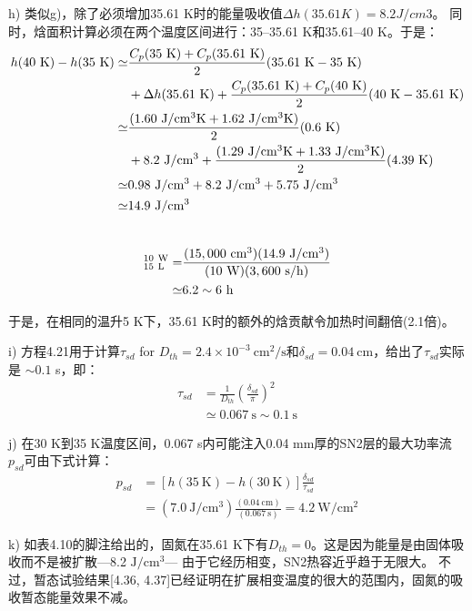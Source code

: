 h) 类似g)，除了必须增加35.61 K时的能量吸收值$\Delta h(35.61 K)=8.2 J/cm3$。
同时，焓面积计算必须在两个温度区间进行：35–35.61 K和35.61–40 K。于是：
\begin{align*}%
h(40\ \mathrm{K})-h(35\ \mathrm{K})\simeq&\frac{C_p(35\ \mathrm{K})+C_p(35.61\ \mathrm{K})}{2}(35.61\ \mathrm{K}-35\ \mathrm{K}) \\\notag
&+\Delta h(35.61\ \mathrm{K})+\frac{C_p(35.61\ \mathrm{K})+C_p(40\ \mathrm{K})}{2}(40\ \mathrm{K}-35.61\ \mathrm{K})\\\notag
\simeq&\frac{(1.60\ \mathrm{J/cm^3 K}+1.62\ \mathrm{J/cm^3 K})}{2}(0.6\ \mathrm{K})\\\notag
&+8.2\ \mathrm{J/cm^3}+\frac{(1.29\ \mathrm{J/cm^3 K}+1.33\ \mathrm{J/cm^3 K})}{2}(4.39\ \mathrm{K})\\\notag
\simeq&0.98\ \mathrm{J/cm^3}+8.2\ \mathrm{J/cm^3}+5.75\ \mathrm{J/cm^3}\\\notag
\simeq& 14.9\ \mathrm{J/cm^3}\\\notag
\end{align*}

\begin{align*}
[\Delta t(30\ \mathrm{K} \rightarrow 35\ \mathrm{K})]_{15\ \mathrm{L}}^{10\ \mathrm{W}}=&\frac{(15,000\ \mathrm{cm^3})(14.9\ \mathrm{J/cm^3})}{(10\ \mathrm{W})(3,600\ \mathrm{s/h})}\\\notag
\simeq&6.2\sim 6\ \mathrm{h} \notag
\end{align*}

于是，在相同的温升5 K下，35.61 K时的额外的焓贡献令加热时间翻倍(2.1倍)。

i) 方程4.21用于计算$\tau_{sd}$ for $D_{th} = 2.4\times 10^{−3} \ \mathrm{cm^2/s}$和$\delta_{sd}=0.04\ \mathrm{cm}$，给出了$\tau_{sd}$实际是 $\sim 0.1$ s，即：
\begin{align*}%
\tau_{sd}&=\frac{1}{D_{th}}\left(\frac{\delta_{sd}}{\pi}\right)^2 \\\tag{4.21}
&\simeq 0.067\ \mathrm{s}\sim 0.1\ \mathrm{s}
\end{align*}

j) 在30 K到35 K温度区间，0.067 s内可能注入0.04 mm厚的SN2层的最大功率流$p_{sd}$可由下式计算：
\begin{align*}%
p_{sd}&=[h(35\ \mathrm{K})-h(30\ \mathrm{K})]\frac{\delta_{sd}}{\tau_{sd}}\\
&=(7.0\ \mathrm{J/cm^3})\frac{(0.04\ \mathrm{cm})}{(0.067\ \mathrm{s})}=4.2 \ \mathrm{W/cm^2}
\end{align*}

k) 如表4.10的脚注给出的，固氮在35.61 K下有$D_{th} = 0$。这是因为能量是由固体吸收而不是被扩散---8.2 $\mathrm{J/cm^3}$---
由于它经历相变，SN2热容近乎趋于无限大。
不过，暂态试验结果[4.36, 4.37]已经证明在扩展相变温度的很大的范围内，固氮的吸收暂态能量效果不减。

